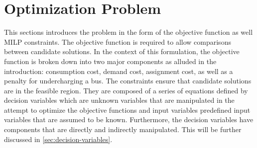 \documentclass[11pt,a4paper,final]{article}
\begin{document}
\section{Optimization Problem}
\label{optimization-problem}
This sections introduces the problem in the form of the objective function as well MILP constraints. The objective
function is required to allow comparisons between candidate solutions. In the context of this formulation, the objective
function is broken down into two major components as alluded in the introduction: consumption cost, demand cost,
assignment cost, as well as a penalty for undercharging a bus. The constraints ensure that candidate solutions are in
the feasible region. They are composed of a series of equations defined by decision variables which are unknown
variables that are manipulated in the attempt to optimize the objective functions and input variables predefined input
variables that are assumed to be known. Furthermore, the decision variables have components that are directly and
indirectly manipulated. This will be further discussed in \ref{sec:decision-variables}.
\end{document}
